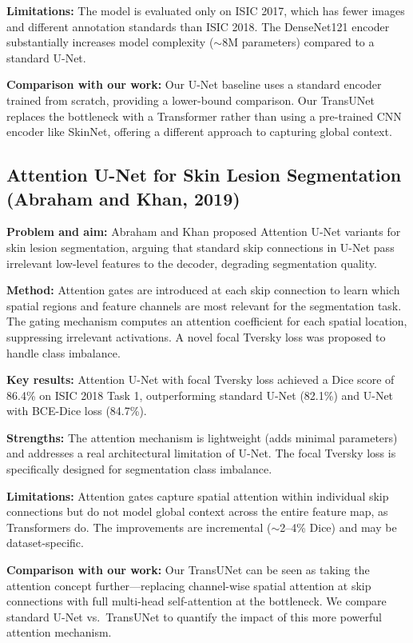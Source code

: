 \documentclass[10pt,twocolumn]{article}
\begin{document}
\textbf{Limitations:} The model is evaluated only on ISIC 2017, which has fewer images and different annotation standards than ISIC 2018. The DenseNet121 encoder substantially increases model complexity ($\sim$8M parameters) compared to a standard U-Net.

\textbf{Comparison with our work:} Our U-Net baseline uses a standard encoder trained from scratch, providing a lower-bound comparison. Our TransUNet replaces the bottleneck with a Transformer rather than using a pre-trained CNN encoder like SkinNet, offering a different approach to capturing global context.

\subsection{Attention U-Net for Skin Lesion Segmentation (Abraham and Khan, 2019)}

\textbf{Problem and aim:} Abraham and Khan \cite{Abraham2019} proposed Attention U-Net variants for skin lesion segmentation, arguing that standard skip connections in U-Net pass irrelevant low-level features to the decoder, degrading segmentation quality.

\textbf{Method:} Attention gates are introduced at each skip connection to learn which spatial regions and feature channels are most relevant for the segmentation task. The gating mechanism computes an attention coefficient for each spatial location, suppressing irrelevant activations. A novel focal Tversky loss was proposed to handle class imbalance.

\textbf{Key results:} Attention U-Net with focal Tversky loss achieved a Dice score of 86.4\% on ISIC 2018 Task 1, outperforming standard U-Net (82.1\%) and U-Net with BCE-Dice loss (84.7\%).

\textbf{Strengths:} The attention mechanism is lightweight (adds minimal parameters) and addresses a real architectural limitation of U-Net. The focal Tversky loss is specifically designed for segmentation class imbalance.

\textbf{Limitations:} Attention gates capture spatial attention within individual skip connections but do not model global context across the entire feature map, as Transformers do. The improvements are incremental ($\sim$2--4\% Dice) and may be dataset-specific.

\textbf{Comparison with our work:} Our TransUNet can be seen as taking the attention concept further---replacing channel-wise spatial attention at skip connections with full multi-head self-attention at the bottleneck. We compare standard U-Net vs.\ TransUNet to quantify the impact of this more powerful attention mechanism.
\end{document}

